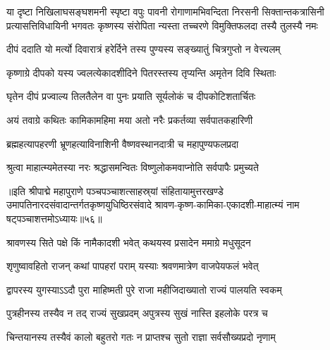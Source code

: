 \fourlineindentedshloka
{या दृष्टा निखिलाघसङ्घशमनी स्पृष्टा वपुः पावनी}
{रोगाणामभिवन्दिता निरसनी सिक्तान्तकत्रासिनी}
{प्रत्यासत्तिविधायिनी भगवतः कृष्णस्य संरोपिता}
{न्यस्ता तच्चरणे विमुक्तिफलदा तस्यै तुलस्यै नमः}%

\twolineshloka
{दीपं ददाति यो मर्त्यो दिवारात्रं हरेर्दिने}
{तस्य पुण्यस्य सङ्ख्यातुं चित्रगुप्तो न वेत्त्यलम्}%

\twolineshloka
{कृष्णाग्रे दीपको यस्य ज्वलत्येकादशीदिने}
{पितरस्तस्य तृप्यन्ति अमृतेन दिवि स्थिताः}%

\twolineshloka
{घृतेन दीपं प्रज्वाल्य तिलतैलेन वा पुनः}
{प्रयाति सूर्यलोकं च दीपकोटिशतार्चितः}%

\twolineshloka
{अयं तवाग्रे कथितः कामिकामहिमा मया}
{अतो नरैः प्रकर्तव्या सर्वपातकहारिणी}%

\twolineshloka
{ब्रह्महत्यापहरणी भ्रूणहत्याविनाशिनी}
{वैष्णवस्थानदात्री च महापुण्यफलप्रदा}%

\twolineshloka
{श्रुत्वा माहात्म्यमेतस्या नरः श्रद्धासमन्वितः}
{विष्णुलोकमवाप्नोति सर्वपापैः प्रमुच्यते}%

॥इति श्रीपाद्मे महापुराणे पञ्चपञ्चाशत्साहस्र्यां संहितायामुत्तरखण्डे उमापतिनारदसंवादान्तर्गतकृष्णयुधिष्ठिरसंवादे श्रावण-कृष्ण-कामिका-एकादशी-माहात्म्यं नाम षट्पञ्चाशत्तमोऽध्यायः॥५६॥

\genMangalaShloka

\hyperref[sec:ekadashi_mahatmyam_padma_puranam]{\closesub}
\clearpage

\label{sec:padma-shravana-shukla-putrada}

\ganapatyadiDhyanam
\padmaPuranam



\twolineshloka
{श्रावणस्य सिते पक्षे किं नामैकादशी भवेत्}
{कथयस्व प्रसादेन ममाग्रे मधुसूदन}%


\twolineshloka
{शृणुष्वावहितो राजन् कथां पापहरां पराम्}
{यस्याः श्रवणमात्रेण वाजपेयफलं भवेत्}%

\twolineshloka
{द्वापरस्य युगस्याऽऽदौ पुरा माहिष्मती पुरे}
{राजा महीजिदाख्यातो राज्यं पालयति स्वकम्}%

\twolineshloka
{पुत्रहीनस्य तस्यैव न तद् राज्यं सुखप्रदम्}
{अपुत्रस्य सुखं नास्ति इहलोके परत्र च}%

\twolineshloka
{चिन्तयानस्य तस्यैवं कालो बहुतरो गतः}
{न प्राप्तश्च सुतो राज्ञा सर्वसौख्यप्रदो नृणाम्}%

